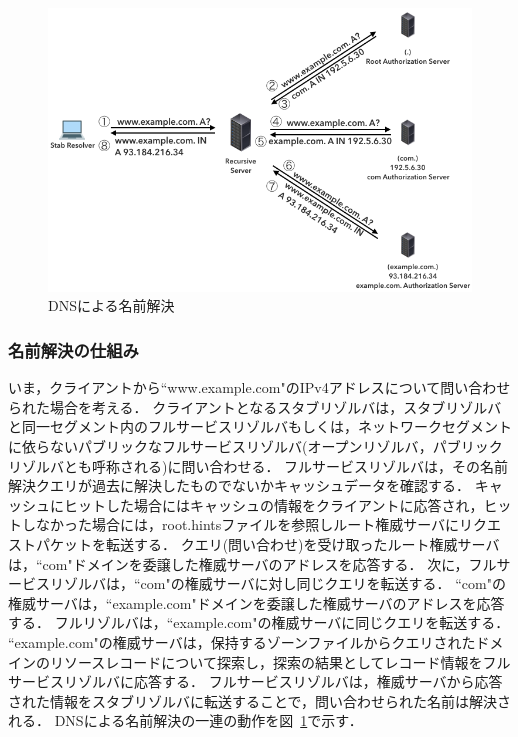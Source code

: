 \begin{figure}[h]
 \centering
 \includegraphics[width=12.0cm]{figure/dns-name-resolution.png}
 \caption{DNSによる名前解決}
 \label{fig:dns-name-resolution}
\end{figure}

\subsubsection{名前解決の仕組み}
\label{sec:dns-mechanism}
いま，クライアントから``www.example.com"のIPv4アドレスについて問い合わせられた場合を考える．
クライアントとなるスタブリゾルバは，スタブリゾルバと同一セグメント内のフルサービスリゾルバもしくは，ネットワークセグメントに依らないパブリックなフルサービスリゾルバ(オープンリゾルバ，パブリックリゾルバとも呼称される)に問い合わせる．
フルサービスリゾルバは，その名前解決クエリが過去に解決したものでないかキャッシュデータを確認する．
キャッシュにヒットした場合にはキャッシュの情報をクライアントに応答され，ヒットしなかった場合には，root.hintsファイルを参照しルート権威サーバにリクエストパケットを転送する．
クエリ(問い合わせ)を受け取ったルート権威サーバは，``com"ドメインを委譲した権威サーバのアドレスを応答する．
次に，フルサービスリゾルバは，``com"の権威サーバに対し同じクエリを転送する．
``com"の権威サーバは，``example.com"ドメインを委譲した権威サーバのアドレスを応答する．
フルリゾルバは，``example.com"の権威サーバに同じクエリを転送する．
``example.com"の権威サーバは，保持するゾーンファイルからクエリされたドメインのリソースレコードについて探索し，探索の結果としてレコード情報をフルサービスリゾルバに応答する．
フルサービスリゾルバは，権威サーバから応答された情報をスタブリゾルバに転送することで，問い合わせられた名前は解決される．
DNSによる名前解決の一連の動作を図~\ref{fig:dns-name-resolution}で示す．

